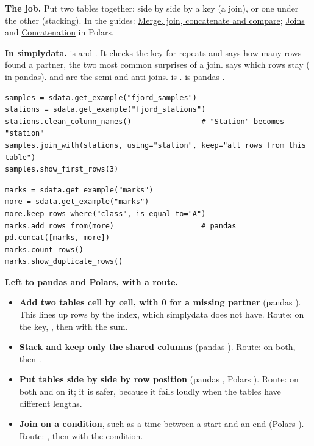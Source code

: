 
\textbf{The job.} Put two tables together: side by side by a key (a join), or one under the other
(stacking). In the guides: \href{https://pandas.pydata.org/docs/user_guide/merging.html}{Merge, join,
concatenate and compare};
\href{https://docs.pola.rs/user-guide/transformations/joins/}{Joins} and
\href{https://docs.pola.rs/user-guide/transformations/concatenation/}{Concatenation} in Polars.

\textbf{In simplydata.}  is  and . It checks the key for repeats
and says how many rows found a partner, the two most common surprises of a join.  says
which rows stay ( in pandas).  and 
are the semi and anti joins.  is .  is
pandas .

\begin{lstlisting}[style=py]
samples = sdata.get_example("fjord_samples")
stations = sdata.get_example("fjord_stations")
stations.clean_column_names()                # "Station" becomes "station"
samples.join_with(stations, using="station", keep="all rows from this table")
samples.show_first_rows(3)
\end{lstlisting}

\begin{lstlisting}[style=py]
marks = sdata.get_example("marks")
more = sdata.get_example("marks")
more.keep_rows_where("class", is_equal_to="A")
marks.add_rows_from(more)                    # pandas pd.concat([marks, more])
marks.count_rows()
marks.show_duplicate_rows()
\end{lstlisting}

\textbf{Left to pandas and Polars, with a route.}
\begin{itemize}
  \item \textbf{Add two tables cell by cell, with 0 for a missing partner} (pandas
    ). This lines up rows by the index, which simplydata does not have.
    Route:  on the key, , then
     with the sum.
  \item \textbf{Stack and keep only the shared columns} (pandas ). Route:
     on both, then .
  \item \textbf{Put tables side by side by row position} (pandas , Polars
    ). Route:  on both and  on it; it is
    safer, because it fails loudly when the tables have different lengths.
  \item \textbf{Join on a condition}, such as a time between a start and an end (Polars
    ). Route: , then
     with the condition.
\end{itemize}

